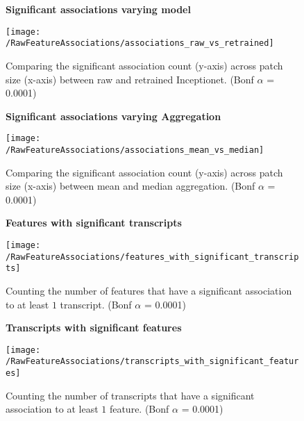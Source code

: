 \documentclass[graybox]{svmult}
\newcommand*{\figuretitle}[1]{%
    {\centering%
    \textbf{#1}%
    \par\medskip}%
}
\begin{document}
\begin{figure}[!htb]
\figuretitle{Significant associations varying model}
\texttt{[image: /RawFeatureAssociations/associations\_raw\_vs\_retrained]}
  \caption{Comparing the significant association count (y-axis) across patch size (x-axis) between raw and retrained Inceptionet. (Bonf $\alpha$ = 0.0001)}\label{fig:associations_raw_vs_retrained}
\endminipage\hfill
{}
\figuretitle{Significant associations varying Aggregation}
\texttt{[image: /RawFeatureAssociations/associations\_mean\_vs\_median]}
  \caption{Comparing the significant association count (y-axis) across patch size (x-axis) between mean and median aggregation. (Bonf $\alpha$ = 0.0001)}\label{fig:associations_mean_vs_median}
\endminipage\hfill
{}%
\figuretitle{Features with significant transcripts}
\texttt{[image: /RawFeatureAssociations/features\_with\_significant\_transcripts]}
  \caption{Counting the number of features that have a significant association to at least $1$ transcript. (Bonf $\alpha$ = 0.0001)}\label{fig:features_with_significant_transcripts}
\endminipage\hfill
{}%
\figuretitle{Transcripts with significant features}
\texttt{[image: /RawFeatureAssociations/transcripts\_with\_significant\_features]}
  \caption{Counting the number of transcripts that have a significant association to at least $1$ feature. (Bonf $\alpha$ = 0.0001)}\label{fig:transcripts_with_significant_features}
\endminipage

\end{figure}

\end{document}
